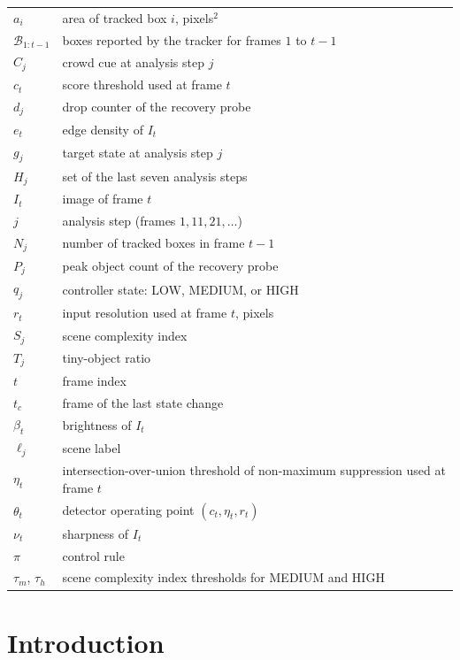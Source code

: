 \documentclass[journal]{new-aiaa}
\begin{document}
{\renewcommand\arraystretch{1.0}
\noindent\begin{longtable}{@{}l @{\quad=\quad} l@{}}
$a_i$ & area of tracked box $i$, pixels$^2$ \\
$\mathcal{B}_{1:t-1}$ & boxes reported by the tracker for frames $1$ to $t-1$ \\
$C_j$ & crowd cue at analysis step $j$ \\
$c_t$ & score threshold used at frame $t$ \\
$d_j$ & drop counter of the recovery probe \\
$e_t$ & edge density of $I_t$ \\
$g_j$ & target state at analysis step $j$ \\
$H_j$ & set of the last seven analysis steps \\
$I_t$ & image of frame $t$ \\
$j$ & analysis step (frames $1, 11, 21, \dots$) \\
$N_j$ & number of tracked boxes in frame $t-1$ \\
$P_j$ & peak object count of the recovery probe \\
$q_j$ & controller state: LOW, MEDIUM, or HIGH \\
$r_t$ & input resolution used at frame $t$, pixels \\
$S_j$ & scene complexity index \\
$T_j$ & tiny-object ratio \\
$t$ & frame index \\
$t_c$ & frame of the last state change \\
$\beta_t$ & brightness of $I_t$ \\
$\ell_j$ & scene label \\
$\eta_t$ & intersection-over-union threshold of non-maximum suppression used at frame $t$ \\
$\theta_t$ & detector operating point $(c_t,\eta_t,r_t)$ \\
$\nu_t$ & sharpness of $I_t$ \\
$\pi$ & control rule \\
$\tau_m$, $\tau_h$ & scene complexity index thresholds for MEDIUM and HIGH \\
\end{longtable}}
\addtocounter{table}{-1}

\section{Introduction}\label{sec:intro}
\end{document}

